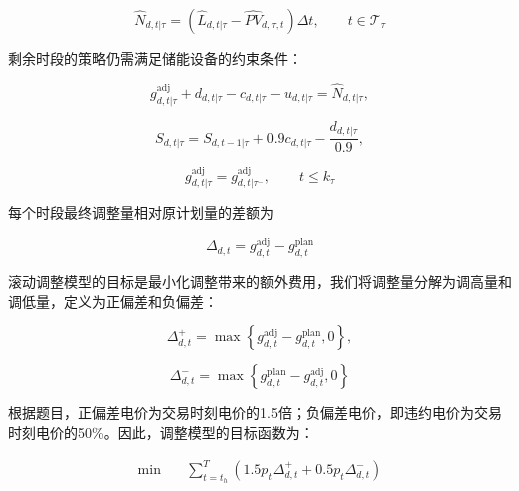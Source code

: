 \documentclass[UTF8]{ctexart}
\begin{document}
    \begin{equation}
        \widehat N_{d,t|\tau}
        =\left(
        \widehat L_{d,t|\tau}
        -\widehat{PV}_{d,\tau,t}
        \right)\Delta t,
        \qquad t\in\mathcal T_\tau
    \end{equation}
    
    剩余时段的策略仍需满足储能设备的约束条件：
    
    \begin{equation}
        g_{d,t|\tau}^{\mathrm{adj}}+d_{d,t|\tau}
        -c_{d,t|\tau}-u_{d,t|\tau}
        =\widehat N_{d,t|\tau},
    \end{equation}
    
    \begin{equation}
        S_{d,t|\tau}=S_{d,t-1|\tau}
        +0.9c_{d,t|\tau}
        -\frac{d_{d,t|\tau}}{0.9},
    \end{equation}
    
    \begin{equation}
        g_{d,t|\tau}^{\mathrm{adj}}
        =g_{d,t|\tau^-}^{\mathrm{adj}},
        \qquad t\leq k_\tau
    \end{equation}
    
    每个时段最终调整量相对原计划量的差额为
    
    \begin{equation}
        \Delta_{d,t}
        =g_{d,t}^{\mathrm{adj}}-g_{d,t}^{\mathrm{plan}}
    \end{equation}
    
    滚动调整模型的目标是最小化调整带来的额外费用，我们将调整量分解为调高量和调低量，定义为正偏差和负偏差：
    
    \begin{equation}
        \Delta_{d,t}^{+}
        =\max\left\{g_{d,t}^{\mathrm{adj}}-g_{d,t}^{\mathrm{plan}},0\right\},
    \end{equation}
    
    \begin{equation}
        \Delta_{d,t}^{-}
        =\max\left\{g_{d,t}^{\mathrm{plan}}-g_{d,t}^{\mathrm{adj}},0\right\}
    \end{equation}
    
    根据题目，正偏差电价为交易时刻电价的1.5倍；负偏差电价，即违约电价为交易时刻电价的50\%。因此，调整模型的目标函数为：
    
    \begin{equation}
        \begin{aligned}
            \min\quad
            & \sum_{t=t_{h}}^{T}(1.5p_{t}\Delta_{d,t}^{+}+0.5p_t\Delta_{d,t}^{-})
        \end{aligned}
    \end{equation}
    
\end{document}
